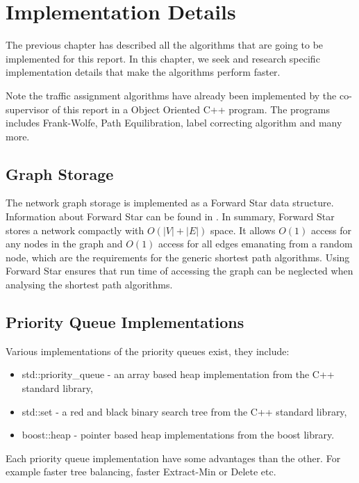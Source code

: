 \chapter{Implementation Details} \label{chap:implementation}

The previous chapter has described all the algorithms that are going to be implemented for this report. 
In this chapter, we seek and research specific implementation details that make the algorithms perform faster.

Note the traffic assignment algorithms have already been implemented by the co-supervisor of this report in a Object Oriented C++ program.
The programs includes Frank-Wolfe, Path Equilibration,
label correcting algorithm and many more.

\section{Graph Storage}
The network graph storage is implemented as a Forward Star data structure.
Information about Forward Star can be found in \citep{Sheffi}.
In summary, Forward Star stores a network compactly with $O(|V|+|E|)$ space.
It allows $O(1)$ access for any nodes in the graph and $O(1)$ access
for all edges emanating from a random node,
which are the requirements for the generic shortest path algorithms.
Using Forward Star ensures that run time of accessing the graph can be neglected when analysing the shortest path algorithms.

\section{Priority Queue Implementations}

Various implementations of the priority queues exist,
they include:
\begin{itemize}
    \item std::priority\_queue - an array based heap implementation from the C++ standard library,
    \item std::set - a red and black binary search tree from the C++ standard library,
    \item boost::heap - pointer based heap implementations from the boost library.
\end{itemize}
Each priority queue implementation have some advantages than the other.
For example faster tree balancing, faster Extract-Min or Delete etc.

